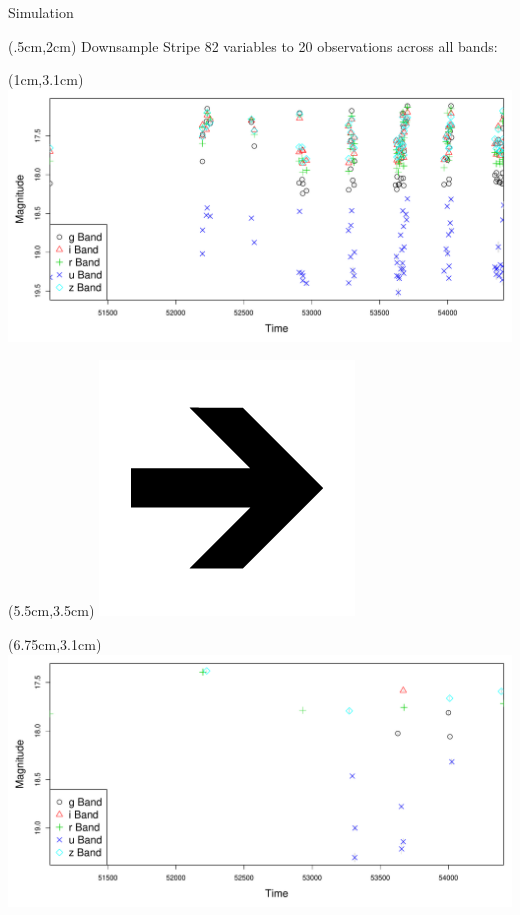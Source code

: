 \documentclass[12pt]{beamer}
\begin{document}
\begin{frame}{Simulation}

  \begin{textblock*}{12cm}(.5cm,2cm) %
Downsample Stripe 82 variables to 20 observations across all bands:
\end{textblock*}

  \begin{textblock*}{3cm}(1cm,3.1cm) %
\includegraphics[scale=.15]{figs/unfolded_13350.pdf}
\end{textblock*}


  \begin{textblock*}{3cm}(5.5cm,3.5cm) %
\includegraphics[scale=.15]{figs/rightarrow.png}
\end{textblock*}

  \begin{textblock*}{3cm}(6.75cm,3.1cm) %
\includegraphics[scale=.15]{figs/unfolded_13350down.pdf}
\end{textblock*}


\end{frame}
\end{document}

